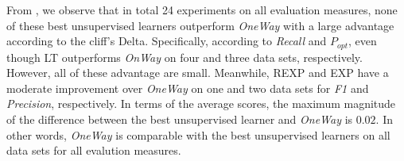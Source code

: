 From , we observe that in total 24 experiments on all evaluation measures, 
none of these best unsupervised learners outperform {\it OneWay} with a large advantage according
to the cliff's Delta. Specifically,  according to {\it Recall} and $P_{opt}$,
even though LT outperforms {\it OnWay} on four and three data sets, respectively. However, all of
these advantage are small. Meanwhile, REXP and EXP have a moderate improvement
over {\it OneWay} on one and two data sets for {\it F1} and {\it Precision}, respectively.
In terms of the average scores, the maximum magnitude of the difference between the best unsupervised 
learner and {\it OneWay} is $0.02$. In other words, {\it OneWay} is comparable with the best unsupervised
learners on all data sets for all evalution measures.




\begin{table}[]
    \centering
    \caption{Best Unsupervised Learner(A) vs. OneWay(B)}
    \label{tab:unsu_oneway}
\end{table}


